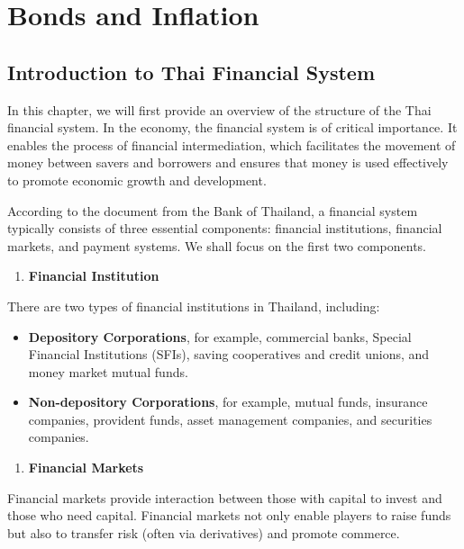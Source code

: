 \documentclass[
]{book}
\providecommand{\tightlist}{%
  \setlength{\itemsep}{0pt}\setlength{\parskip}{0pt}}
\theoremstyle{definition}
\theoremstyle{definition}
\theoremstyle{definition}
\theoremstyle{definition}
\theoremstyle{remark}
\begin{document}
\chapter{Bonds and Inflation}\label{bonds-and-inflation}

\section{Introduction to Thai Financial System}\label{introduction-to-thai-financial-system}

In this chapter, we will first provide an overview of the structure of the Thai financial system. In the economy, the financial system is of critical importance. It enables the process of financial intermediation, which facilitates the movement of money between savers and borrowers and ensures that money is used effectively to promote economic growth and development.

According to the document from the Bank of Thailand, a financial system typically consists of three essential components: financial institutions, financial markets, and payment systems. We shall focus on the first two components.

\begin{enumerate}
\def\labelenumi{\arabic{enumi}.}
\tightlist
\item
  \textbf{Financial Institution}
\end{enumerate}

There are two types of financial institutions in Thailand, including:

\begin{itemize}
\item
  \textbf{Depository Corporations}, for example, commercial banks, Special Financial Institutions (SFIs), saving cooperatives and credit unions, and money market mutual funds.
\item
  \textbf{Non-depository Corporations}, for example, mutual funds, insurance companies, provident funds, asset management companies, and securities companies.
\end{itemize}

\begin{enumerate}
\def\labelenumi{\arabic{enumi}.}
\setcounter{enumi}{1}
\tightlist
\item
  \textbf{Financial Markets}
\end{enumerate}

Financial markets provide interaction between those with capital to invest and those who need capital. Financial markets not only enable players to raise funds but also to transfer risk (often via derivatives) and promote commerce.
\end{document}
